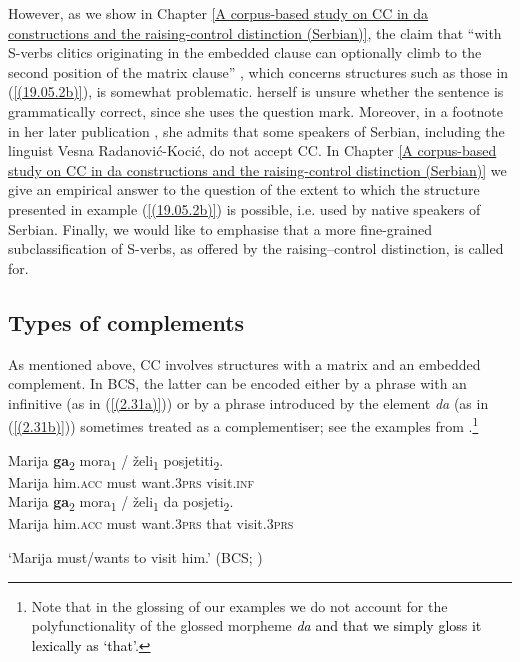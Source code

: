 \noindent However, as we show in Chapter \ref{A corpus-based study on CC in da constructions and the raising-control distinction (Serbian)}, the claim that “with S-verbs clitics originating in the embedded clause can optionally climb to the second position of the matrix clause” \citep[119]{Progovac93}, which concerns structures such as those in (\ref{(19.05.2b)}), is somewhat problematic. \citet[119]{Progovac93} herself is unsure whether the sentence is grammatically correct, since she uses the question mark. Moreover, in a footnote in her later publication \citep[146]{Progovac05}, she admits that some speakers of Serbian, including the linguist Vesna Radanović-Kocić, do not accept CC. In Chapter \ref{A corpus-based study on CC in da constructions and the raising-control distinction (Serbian)} we give an empirical answer to the question of the extent to which the structure presented in example (\ref{(19.05.2b)}) is possible, i.e. used by native speakers of Serbian. Finally, we would like to emphasise that a more fine-grained subclassification of S-verbs, as offered by the raising--control distinction, is called for.

\subsection{Types of complements}
\label{Types of complements}
As mentioned above, CC involves structures with a matrix and an embedded complement. In BCS, the latter can be encoded either by a phrase with an infinitive (as in (\ref{(2.31a)})) or by a phrase introduced by the element \textit{da} (as in (\ref{(2.31b)})) sometimes treated as a complementiser; see the examples from \citet[174]{Stjepanovic04}.\footnote{Note that in the glossing of our examples we do not account for the polyfunctionality of the glossed morpheme \textcolor{black}{\textit{da} and that we simply gloss it lexically as ‘that’}.} 


\begin{exe}\ex
\begin{xlist}
\ex\label{(2.31a)}
\gll Marija \textbf{ga}\textsubscript{2} mora\textsubscript{1} / želi\textsubscript{1} posjetiti\textsubscript{2}.\\
 Marija him\textsc{.acc} must {} want\textsc{.3prs} visit\textsc{.inf} \\
\ex\label{(2.31b)}
\gll Marija \textbf{ga}\textsubscript{2} mora\textsubscript{1} / želi\textsubscript{1} da posjeti\textsubscript{2}.\\
 Marija him\textsc{.acc} must {} want\textsc{.3prs} that visit\textsc{.3prs} \\
\end{xlist}
\glt ‘Marija must/wants to visit him.’ 
\hfill (BCS; \citealt[174]{Stjepanovic04}) 
\end{exe}

